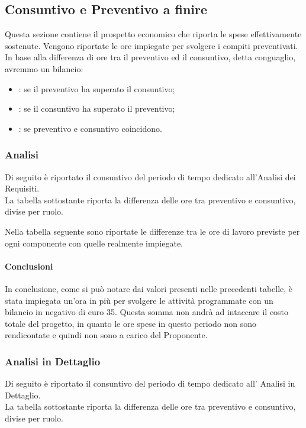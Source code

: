 \subsection{Consuntivo e Preventivo a finire}
Questa sezione contiene il prospetto economico che riporta le spese effettivamente sostenute. Vengono riportate le ore impiegate per svolgere i compiti preventivati. In base alla differenza di ore tra il preventivo ed il consuntivo, detta conguaglio, avremmo un bilancio:
\begin{itemize}
\item {}: se il preventivo ha superato il consuntivo;
\item {}: se il consuntivo ha superato il preventivo;
\item {}: se preventivo e consuntivo coincidono.
\end{itemize}
\subsubsection{Analisi}
Di seguito è riportato il consuntivo del periodo di tempo dedicato all'Analisi dei Requisiti.\\
La tabella sottostante riporta la differenza delle ore tra preventivo e consuntivo, divise per ruolo.


Nella tabella seguente sono riportate le differenze tra le ore di lavoro previste per ogni componente con quelle realmente impiegate.


\paragraph{Conclusioni}
In conclusione, come si può notare dai valori presenti nelle precedenti tabelle, è stata impiegata un'ora in più per svolgere le attività programmate con un bilancio in negativo di euro 35. Questa somma non andrà ad intaccare il costo totale del progetto, in quanto le ore spese in questo periodo non sono rendicontate e quindi non sono a carico del Proponente.

\subsubsection{Analisi in Dettaglio}
Di seguito è riportato il consuntivo del periodo di tempo dedicato all' Analisi in Dettaglio.\\
La tabella sottostante riporta la differenza delle ore tra preventivo e consuntivo, divise per ruolo.

